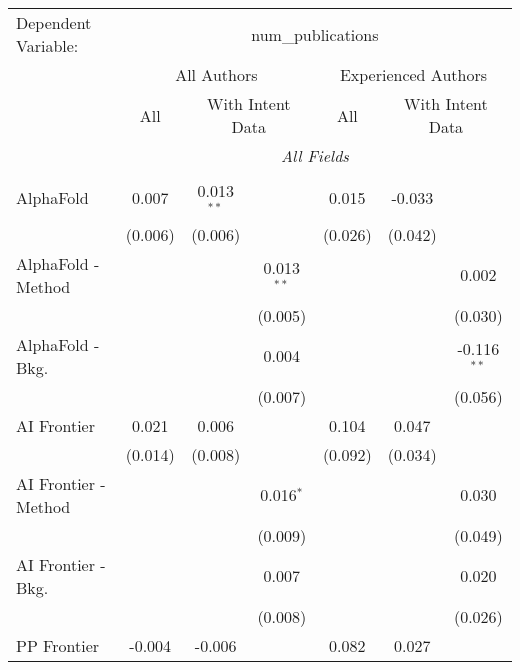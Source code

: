 \begingroup
\centering
\begin{tabular}{lcccccc}
   \tabularnewline \midrule \midrule
   Dependent Variable: & \multicolumn{6}{c}{num\_publications}\\
 & \multicolumn{3}{c}{All Authors} & \multicolumn{3}{c}{Experienced Authors} \\
\cmidrule(lr){2-4} \cmidrule(lr){5-7}
 & \multicolumn{1}{c}{All} & \multicolumn{2}{c}{With Intent Data} & \multicolumn{1}{c}{All} & \multicolumn{2}{c}{With Intent Data} \\
\cmidrule(lr){2-2} \cmidrule(lr){3-4} \cmidrule(lr){5-5} \cmidrule(lr){6-7}
 & \multicolumn{6}{c}{\textit{All Fields}} \\ \\
   AlphaFold            & 0.007       & 0.013$^{**}$  &              & 0.015   & -0.033  &   \\   
                        & (0.006)     & (0.006)       &              & (0.026) & (0.042) &   \\   
   AlphaFold - Method   &             &               & 0.013$^{**}$ &         &         & 0.002\\   
                        &             &               & (0.005)      &         &         & (0.030)\\   
   AlphaFold - Bkg.     &             &               & 0.004        &         &         & -0.116$^{**}$\\   
                        &             &               & (0.007)      &         &         & (0.056)\\   
   AI Frontier          & 0.021       & 0.006         &              & 0.104   & 0.047   &   \\   
                        & (0.014)     & (0.008)       &              & (0.092) & (0.034) &   \\   
   AI Frontier - Method &             &               & 0.016$^{*}$  &         &         & 0.030\\   
                        &             &               & (0.009)      &         &         & (0.049)\\   
   AI Frontier - Bkg.   &             &               & 0.007        &         &         & 0.020\\   
                        &             &               & (0.008)      &         &         & (0.026)\\   
   PP Frontier          & -0.004      & -0.006        &              & 0.082   & 0.027   &   \\   

\end{tabular}
